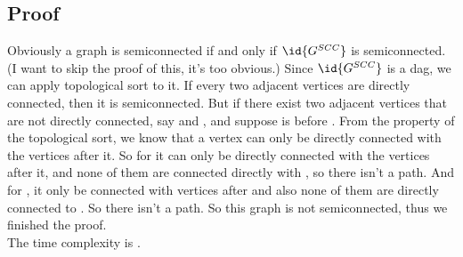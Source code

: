 \documentclass[a4paper]{article}
\begin{document}
\subsection*{Proof}
Obviously a graph  is semiconnected if and only if $\id{G^{SCC}}$ is semiconnected. (I want to skip the proof of this, it's too obvious.)
Since $\id{G^{SCC}}$ is a dag, we can apply topological sort to it. If every two adjacent vertices are directly connected, then it is semiconnected. But if
there exist two adjacent vertices that are not directly connected, say  and , and suppose  is before . From the property of the topological sort,
we know that a vertex can only be directly connected with the vertices after it. So for  it can only be directly connected with the vertices after it, and none of them are connected directly with
, so there isn't a  path. And for , it only be connected with vertices after  and also none of them are directly connected to . So there isn't a  path. So this graph is
not semiconnected, thus we finished the proof.\\
The time complexity is .
\end{document}
